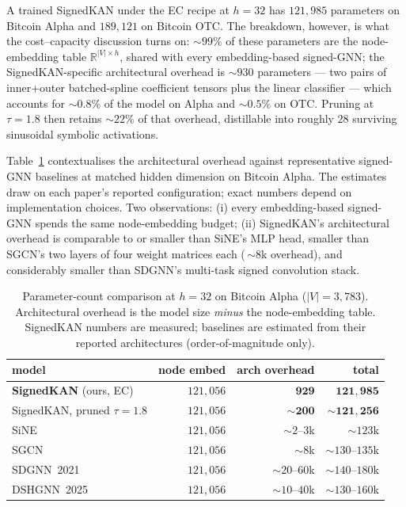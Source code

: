 A trained SignedKAN under the EC recipe at $h\!=\!32$ has
$121{,}985$ parameters on Bitcoin Alpha and $189{,}121$ on Bitcoin
OTC. The breakdown, however, is what the cost--capacity discussion
turns on: $\sim\!99\%$ of these parameters are the node-embedding
table $\mathbb{R}^{|V|\times h}$, shared with every embedding-based
signed-GNN; the SignedKAN-specific architectural overhead is
$\sim\!930$ parameters --- two pairs of inner+outer batched-spline
coefficient tensors plus the linear classifier --- which accounts
for $\sim\!0.8\%$ of the model on Alpha and $\sim\!0.5\%$ on OTC.
Pruning at $\tau\!=\!1.8$ then retains $\sim\!22\%$ of that
overhead, distillable into roughly $28$ surviving sinusoidal
symbolic activations.

Table~\ref{tab:param-compare} contextualises the architectural
overhead against representative signed-GNN baselines at matched
hidden dimension on Bitcoin Alpha. The estimates draw on each
paper's reported configuration; exact numbers depend on
implementation choices. Two observations: (i) every embedding-based
signed-GNN spends the same node-embedding budget; (ii) SignedKAN's
architectural overhead is comparable to or smaller than SiNE's MLP
head, smaller than SGCN's two layers of four weight matrices each
(\,$\sim\!8$k overhead), and considerably smaller than SDGNN's
multi-task signed convolution stack.

\begin{table}[t]
\centering
\caption{Parameter-count comparison at $h\!=\!32$ on Bitcoin Alpha
($|V|\!=\!3{,}783$). Architectural overhead is the model size
\emph{minus} the node-embedding table. SignedKAN numbers are
measured; baselines are estimated from their reported architectures
(order-of-magnitude only).}
\label{tab:param-compare}
\setlength{\tabcolsep}{4pt}
\small
\begin{tabular}{@{}lrrr@{}}
\toprule
model & node embed & arch overhead & total \\
\midrule
\textbf{SignedKAN} (ours, EC) & $121{,}056$ & $\mathbf{929}$       & $\mathbf{121{,}985}$ \\
SignedKAN, pruned $\tau\!=\!1.8$ & $121{,}056$ & $\mathbf{\sim\!200}$ & $\mathbf{\sim\!121{,}256}$ \\
SiNE~\cite{wang2017sine}  & $121{,}056$ & $\sim\!2$--$3$k       & $\sim\!123$k \\
SGCN~\cite{derr2018sgcn}  & $121{,}056$ & $\sim\!8$k            & $\sim\!130$--$135$k \\
SDGNN~2021                 & $121{,}056$ & $\sim\!20$--$60$k     & $\sim\!140$--$180$k \\
DSHGNN~2025                & $121{,}056$ & $\sim\!10$--$40$k     & $\sim\!130$--$160$k \\
\bottomrule
\end{tabular}
\end{table}

